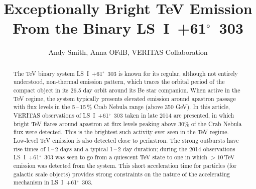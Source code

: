 \documentclass[preprint2]{aastex}
\newcommand{\lsi}{LS~I~+61$^{\circ}$~303}
\newcommand{\tev}{\,TeV}
\begin{document}

\title{Exceptionally Bright TeV Emission From the Binary \lsi{}}


\author{
Andy Smith,
Anna OFdB,
VERITAS Collaboration
}




\begin{abstract}
The TeV binary system \lsi{} is known for its regular, although not entirely understood, non-thermal emission pattern, which traces the orbital period of the compact object in its 26.5 day orbit around its Be star companion. When active in the TeV regime, the system typically presents elevated emission around apastron passage with flux levels in the 5\,--\,15\,\% Crab Nebula range (above 350 GeV). In this article, VERITAS observations of \lsi{} taken in late 2014 are presented, in which bright TeV flares around apastron at flux levels peaking above $30\%$ of the Crab Nebula flux were detected. This is the brightest such activity ever seen in the TeV regime. Low-level TeV emission is also detected close to periastron. The strong outbursts have rise times of 1\,--\,2 days and a typical 1\,--\,2 day duration; during the 2014 observations \lsi{} was seen to go from a quiescent TeV state to one in which $>10$\tev{} emission was detected from the system. This short acceleration time for particles (for galactic scale objects) provides strong constraints on the nature of the accelerating mechanism in \lsi{}.
\end{abstract}
\end{document}
